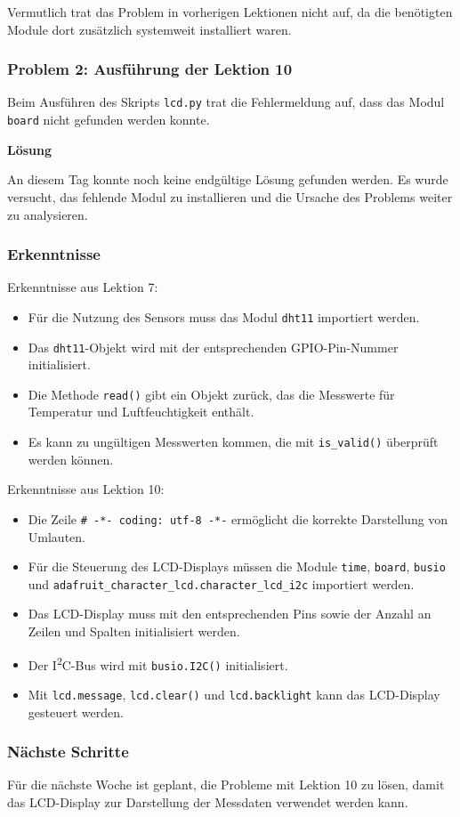 Vermutlich trat das Problem in vorherigen Lektionen nicht auf,
da die benötigten Module dort zusätzlich systemweit installiert waren.

\subsubsection{Problem 2: Ausführung der Lektion 10}

Beim Ausführen des Skripts \texttt{lcd.py} trat die Fehlermeldung auf,
dass das Modul \texttt{board} nicht gefunden werden konnte.

\textbf{Lösung}

An diesem Tag konnte noch keine endgültige Lösung gefunden werden.
Es wurde versucht, das fehlende Modul zu installieren und die Ursache
des Problems weiter zu analysieren.

\subsubsection{Erkenntnisse}

Erkenntnisse aus Lektion 7:

\begin{itemize}
    \item Für die Nutzung des Sensors muss das Modul
    \texttt{dht11} importiert werden.

    \item Das \texttt{dht11}-Objekt wird mit der entsprechenden
    GPIO-Pin-Nummer initialisiert.

    \item Die Methode \texttt{read()} gibt ein Objekt zurück,
    das die Messwerte für Temperatur und Luftfeuchtigkeit enthält.

    \item Es kann zu ungültigen Messwerten kommen, die mit
    \texttt{is\_valid()} überprüft werden können.
\end{itemize}

Erkenntnisse aus Lektion 10:

\begin{itemize}
    \item Die Zeile
    \texttt{\# -*- coding: utf-8 -*-}
    ermöglicht die korrekte Darstellung von Umlauten.

    \item Für die Steuerung des LCD-Displays müssen die Module
    \texttt{time}, \texttt{board}, \texttt{busio} und
    \texttt{adafruit\_character\_lcd.character\_lcd\_i2c}
    importiert werden.

    \item Das LCD-Display muss mit den entsprechenden Pins sowie
    der Anzahl an Zeilen und Spalten initialisiert werden.

    \item Der I\textsuperscript{2}C-Bus wird mit
    \texttt{busio.I2C()} initialisiert.

    \item Mit \texttt{lcd.message}, \texttt{lcd.clear()} und
    \texttt{lcd.backlight} kann das LCD-Display gesteuert werden.
\end{itemize}

\subsubsection{Nächste Schritte}

Für die nächste Woche ist geplant, die Probleme mit Lektion 10 zu lösen,
damit das LCD-Display zur Darstellung der Messdaten verwendet werden kann.